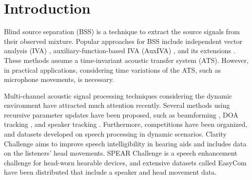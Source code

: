 \documentclass[sip,biber]{now-journal}
\begin{document}
\section{Introduction}\label{sec:intro}
Blind source separation (BSS) \cite{Makino:2018:ASS} is a technique to extract the source signals from their observed mixture.
Popular approaches for BSS include independent vector analysis (IVA) \cite{Kim:2006:ASLP,Hiroe:2006:ICA}, auxiliary-function-based IVA (AuxIVA) \cite{Ono:2011:WASPAA}, and its extensions \cite{Kitamura:2016:ASLP,Nugraha:2020:SPL,Brendel:2020:SP}.
These methods assume a time-invariant acoustic transfer system (ATS).
However, in practical applications, considering time variations of the ATS, such as microphone movements, is necessary.

Multi-channel acoustic signal processing techniques considering the dynamic environment have attracted much attention recently.
Several methods using recursive parameter updates have been proposed, such as beamforming \cite{Higuchi:2017:ASLP}, DOA tracking \cite{Weisberg:2019:ICASSP}, and speaker tracking \cite{Schwartz:2021:ASMP}.
Furthermore, competitions have been organized, and datasets developed on speech processing in dynamic scenarios.
Clarity Challenge \cite{Akeroyd:2023:ICASSP} aims to improve speech intelligibility in hearing aids and includes data on the listeners' head movements.
SPEAR Challenge \cite{Guiraud:2022:IWAENC} is a speech enhancement challenge for head-worn hearable devices, and extensive datasets called EasyCom \cite{Donley:2021:arxiv} have been distributed that include a speaker and head movement data.
\end{document}
